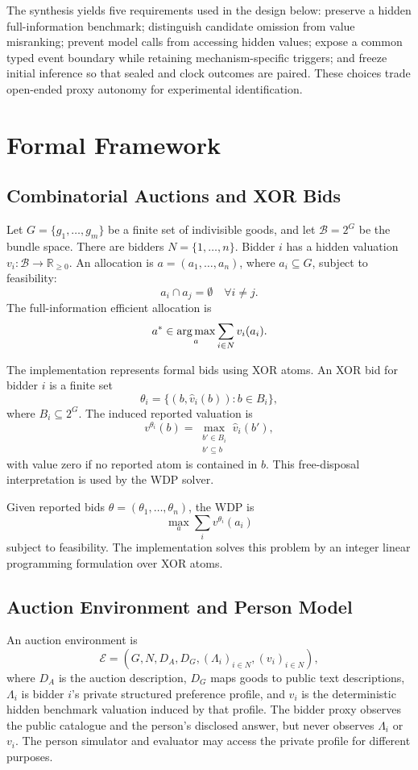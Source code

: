 The synthesis yields five requirements used in the design below: preserve a
hidden full-information benchmark; distinguish candidate omission from value
misranking; prevent model calls from accessing hidden values; expose a common
typed event boundary while retaining mechanism-specific triggers; and freeze
initial inference so that sealed and clock outcomes are paired. These choices
trade open-ended proxy autonomy for experimental identification.

\section{Formal Framework}

\subsection{Combinatorial Auctions and XOR Bids}

Let \(G=\{g_1,\ldots,g_m\}\) be a finite set of indivisible goods, and let \(\mathcal{B}=2^G\) be the bundle space. There are bidders \(N=\{1,\ldots,n\}\). Bidder \(i\) has a hidden valuation \(v_i:\mathcal{B}\to\mathbb{R}_{\geq 0}\). An allocation is \(a=(a_1,\ldots,a_n)\), where \(a_i\subseteq G\), subject to feasibility:
\[
a_i\cap a_j=\emptyset \quad \forall i\neq j.
\]
The full-information efficient allocation is
\[
a^* \in \operatorname*{arg\,max}_a \sum_{i\in N} v_i(a_i).
\]

The implementation represents formal bids using XOR atoms. An XOR bid for bidder \(i\) is a finite set
\[
\theta_i=\{(b,\hat v_i(b)): b\in B_i\},
\]
where \(B_i\subseteq 2^G\). The induced reported valuation is
\[
v^{\theta_i}(b)=
\max_{\substack{b'\in B_i\\b'\subseteq b}}
\hat v_i(b'),
\]
with value zero if no reported atom is contained in \(b\). This free-disposal interpretation is used by the WDP solver.

Given reported bids \(\theta=(\theta_1,\ldots,\theta_n)\), the WDP is
\[
\max_a \sum_i v^{\theta_i}(a_i)
\]
subject to feasibility. The implementation solves this problem by an integer linear programming formulation over XOR atoms.

\subsection{Auction Environment and Person Model}

An auction environment is
\[
\mathcal{E}=(G,N,D_A,D_G,(\Lambda_i)_{i\in N},(v_i)_{i\in N}),
\]
where \(D_A\) is the auction description, \(D_G\) maps goods to public text
descriptions, \(\Lambda_i\) is bidder \(i\)'s private structured preference
profile, and \(v_i\) is the deterministic hidden benchmark valuation induced
by that profile. The bidder proxy observes the public catalogue and the
person's disclosed answer, but never observes \(\Lambda_i\) or \(v_i\). The
person simulator and evaluator may access the private profile for different
purposes.

